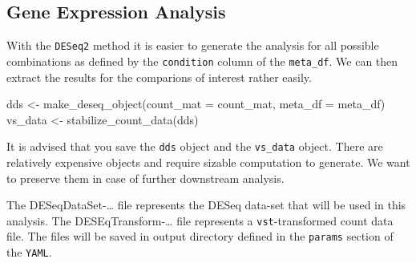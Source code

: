 \documentclass[
  letterpaper,
  DIV=11,
  numbers=noendperiod]{scrartcl}
\newenvironment{Shaded}{\begin{snugshade}}{\end{snugshade}}
\newcommand{\AttributeTok}[1]{\textcolor[rgb]{0.40,0.45,0.13}{#1}}
\newcommand{\FunctionTok}[1]{\textcolor[rgb]{0.28,0.35,0.67}{#1}}
\newcommand{\NormalTok}[1]{\textcolor[rgb]{0.00,0.23,0.31}{#1}}
\newcommand{\OtherTok}[1]{\textcolor[rgb]{0.00,0.23,0.31}{#1}}
\newcommand{\SpecialCharTok}[1]{\textcolor[rgb]{0.37,0.37,0.37}{#1}}
\begin{document}
\begin{Shaded}
\end{Shaded}

\hypertarget{gene-expression-analysis}{%
\subsection{Gene Expression Analysis}\label{gene-expression-analysis}}

With the \texttt{DESeq2} method it is easier to generate the analysis
for all possible combinations as defined by the \texttt{condition}
column of the \texttt{meta\_df}. We can then extract the results for the
comparions of interest rather easily.

\begin{Shaded}
\begin{Highlighting}[]
\NormalTok{dds }\OtherTok{\textless{}{-}} \FunctionTok{make\_deseq\_object}\NormalTok{(}\AttributeTok{count\_mat =}\NormalTok{ count\_mat, }\AttributeTok{meta\_df =}\NormalTok{ meta\_df)}
\NormalTok{vs\_data }\OtherTok{\textless{}{-}} \FunctionTok{stabilize\_count\_data}\NormalTok{(dds)}
\end{Highlighting}
\end{Shaded}

It is advised that you save the \texttt{dds} object and the
\texttt{vs\_data} object. There are relatively expensive objects and
require sizable computation to generate. We want to preserve them in
case of further downstream analysis.

\begin{Shaded}
\end{Shaded}

The DESeqDataSet-\ldots{} file represents the DESeq data-set that will
be used in this analysis. The DESEqTransform-\ldots{} file represents a
\texttt{vst}-transformed count data file. The files will be saved in
output directory defined in the \texttt{params} section of the
\texttt{YAML}.
\end{document}
